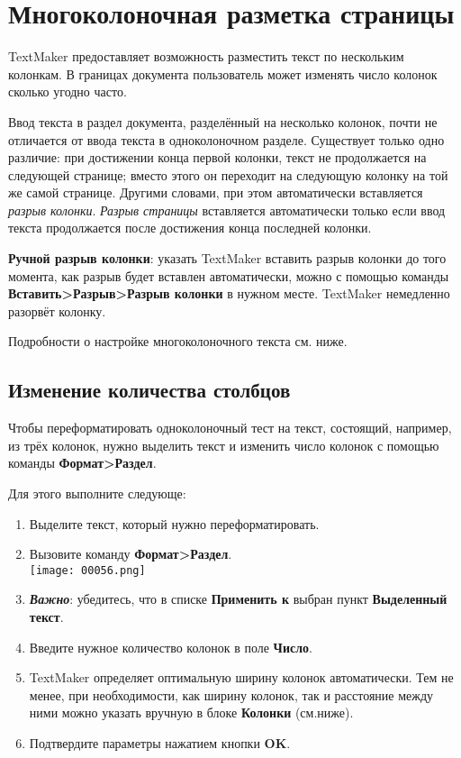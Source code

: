 \documentclass[a4paper,10pt]{article}
\begin{document}
\section{Многоколоночная разметка страницы}
TextMaker предоставляет возможность разместить текст по нескольким колонкам. В границах документа пользователь может изменять число колонок сколько угодно часто.

Ввод текста в раздел документа, разделённый на несколько колонок, почти не отличается от ввода текста в одноколоночном разделе. Существует только одно различие: при достижении конца первой колонки, текст не продолжается на следующей странице; вместо этого он переходит на следующую колонку на той же самой странице. Другими словами, при этом автоматически вставляется \textit{разрыв колонки}. \textit{Разрыв страницы} вставляется автоматически только если ввод текста продолжается после достижения конца последней колонки.

\textbf{Ручной разрыв колонки}: указать TextMaker вставить разрыв колонки до того момента, как разрыв будет вставлен автоматически, можно с помощью команды \textbf{Вставить>Разрыв>Разрыв колонки} в нужном месте. TextMaker немедленно разорвёт колонку.

Подробности о настройке многоколоночного текста см. ниже.

\subsection{Изменение количества столбцов}
Чтобы переформатировать одноколоночный тест на текст, состоящий, например, из трёх колонок, нужно выделить текст и изменить число колонок с помощью команды \textbf{Формат>Раздел}.

Для этого выполните следующе:
\begin{enumerate}
 \item Выделите текст, который нужно переформатировать.
 \item Вызовите команду \textbf{Формат>Раздел}.\\
 \texttt{[image: 00056.png]}
 \item \textbf{\textit{Важно}}: убедитесь, что в списке \textbf{Применить к} выбран пункт \textbf{Выделенный текст}.
 \item Введите нужное количество колонок в поле \textbf{Число}.
 \item TextMaker определяет оптимальную ширину колонок автоматически. Тем не менее, при необходимости, как ширину колонок, так и расстояние между ними можно указать вручную в блоке \textbf{Колонки} (см.ниже).
 \item Подтвердите параметры нажатием кнопки \textbf{OK}.
\end{enumerate}
\end{document}
